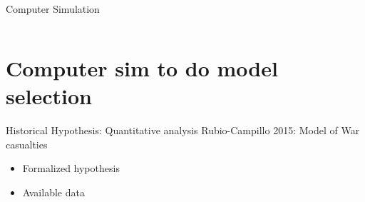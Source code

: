 \documentclass[12pt, notes=show,handout=no]{beamer}
\begin{document}
\begin{frame}{Computer Simulation}
\begin{columns}
\begin{column}{.4\textwidth}
	    
	\end{column}
    \end{columns}
	
\end{frame}


\section{Computer sim to do model selection}

\begin{frame}{Historical Hypothesis: Quantitative analysis}
    Rubio-Campillo 2015:  Model of War casualties
    \begin{itemize}
	\item<1-> Formalized hypothesis 
	\item<2-> Available data
    \end{itemize}

    \begin{center}
    \end{center}


\end{frame}
\end{document}
